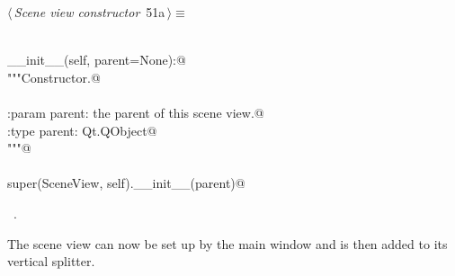 \documentclass[
    a4paper,      %
    10pt,         %
    openright,    %
    notitlepage,  %
    parskip=half, %
]{scrreprt}       %
\theoremstyle{definition}                    %
\begin{document}
\begin{flushleft} \small
\begin{minipage}{\linewidth}\label{scrap73}\raggedright\small
{} $\langle\,${\itshape Scene view constructor}\nobreak\ {\footnotesize {51a}}$\,\rangle\equiv$
\vspace{-1exm}
\begin{list}{}{} \item
\mbox{}\lstinline@@\\
\mbox{}\lstinline@def __init__(self, parent=None):@\\
\mbox{}\lstinline@    """Constructor.@\\
\mbox{}\lstinline@@\\
\mbox{}\lstinline@    :param parent: the parent of this scene view.@\\
\mbox{}\lstinline@    :type parent: Qt.QObject@\\
\mbox{}\lstinline@    """@\\
\mbox{}\lstinline@@\\
\mbox{}\lstinline@    super(SceneView, self).__init__(parent)@\\
\mbox{}\lstinline@@{\NWsep}
\end{list}
\vspace{-1.5ex}
\footnotesize
\begin{list}{}{\setlength{\itemsep}{-\parsep}\setlength{\itemindent}{-\leftmargin}}
\item \NWtxtMacroRefIn\ .

\item{}
\end{list}
\end{minipage}\vspace{4ex}
\end{flushleft}
The scene view can now be set up by the main window and is then added to its
vertical splitter.
\end{document}
